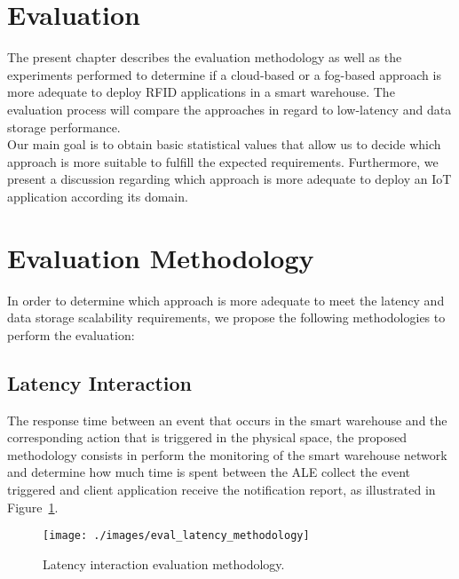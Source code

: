 
\section{Evaluation}
\label{sec:evaluation}
The present chapter describes the evaluation methodology as well as the experiments performed to determine
if a cloud-based or a fog-based approach is more adequate to deploy \gls{RFID} applications in a
smart warehouse. The evaluation process will compare the approaches in regard to low-latency and data
storage performance.\\

Our main goal is to obtain basic statistical values that allow us to decide which approach is more
suitable to fulfill the expected requirements. Furthermore, we present a discussion regarding which
approach is more adequate to deploy an \gls{IoT} application according its domain.

\section{Evaluation Methodology}
\label{sec:eval_methodology}
In order to determine which approach is more adequate to meet the latency and data storage scalability
requirements, we propose the following methodologies to perform the evaluation:

\subsection{Latency Interaction}
\label{sub:eval_methodology_latency}
The response time between an event that occurs in the smart warehouse and the corresponding action
that is triggered in the physical space, the proposed methodology consists in perform the monitoring
of the smart warehouse network and determine how much time is spent between the \gls{ALE} collect the
event triggered and client application receive the notification report, as illustrated in
Figure~\ref{fig:eval_latency_methodology}.

\begin{figure}[ht!]
  \centering
  \texttt{[image: ./images/eval\_latency\_methodology]}
  \caption[Latency evaluation methodology.]{Latency interaction evaluation methodology.}
  \label{fig:eval_latency_methodology}
\end{figure}

